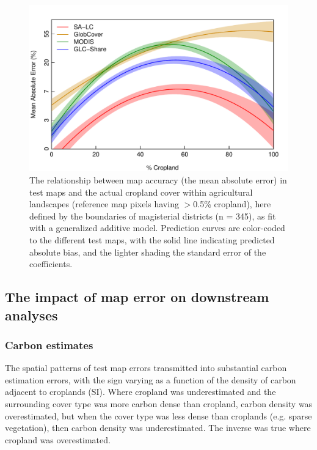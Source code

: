 \documentclass[12 pt, titlepage, a4paper]{article}
\begin{document}
\begin{figure}[!h]
\centerline{\includegraphics[width=.7\textwidth]{figures/fig2.pdf}}
\caption{The relationship between map accuracy (the mean absolute error) in test maps and the actual cropland cover within agricultural landscapes (reference map pixels having $>$0.5\% cropland), here defined by the boundaries of magisterial districts (n = 345), as fit with a generalized additive model. Prediction curves are color-coded to the different test maps, with the solid line indicating predicted absolute bias, and the lighter shading the standard error of the coefficients.}\label{afoto2}
\end{figure}


\vspace{-0.3 cm}
\subsection*{The impact of map error on downstream analyses}
\vspace{-0.2 cm}
\subsubsection*{Carbon estimates}
\vspace{-0.2 cm}
The spatial patterns of test map errors transmitted into substantial carbon estimation errors, with the sign varying as a function of the density of carbon adjacent to croplands (SI). Where cropland was underestimated and the surrounding cover type was more carbon dense than cropland, carbon density was overestimated, but when the cover type was less dense than croplands (e.g. sparse vegetation), then carbon density was underestimated. The inverse was true where cropland was overestimated. 
\end{document}
